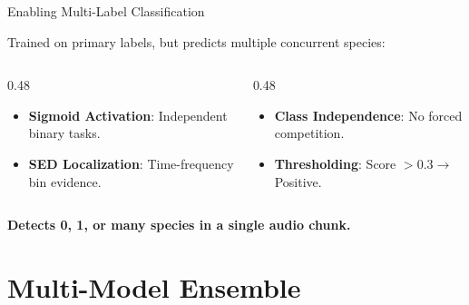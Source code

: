 \documentclass[aspectratio=169, 11pt]{beamer}
\begin{document}
\begin{frame}{Enabling Multi-Label Classification}
    \begin{tcolorbox}[draculabox={From Single-Label to Multi-Label}]
        \scriptsize Trained on primary labels, but predicts multiple concurrent species:
    \end{tcolorbox}

    \begin{columns}[T, onlytextwidth]
        \begin{column}{0.48\textwidth}
            \begin{tcolorbox}[greenbox_tcb={Architecture}]
                \scriptsize
                \begin{itemize}
                    \item \textbf{Sigmoid Activation}: Independent binary tasks.
                    \item \textbf{SED Localization}: Time-frequency bin evidence.
                \end{itemize}
            \end{tcolorbox}
        \end{column}
        \begin{column}{0.48\textwidth}
            \begin{tcolorbox}[greenbox_tcb={Inference Logic}]
                \scriptsize
                \begin{itemize}
                    \item \textbf{Class Independence}: No forced competition.
                    \item \textbf{Thresholding}: Score $> 0.3 \rightarrow$ Positive.
                \end{itemize}
            \end{tcolorbox}
        \end{column}
    \end{columns}
    
    \vspace{0.2cm}
    \centering \textcolor{draculapurple}{\textbf{Detects 0, 1, or many species in a single audio chunk.}}
\end{frame}

\section{Multi-Model Ensemble}
\end{document}
